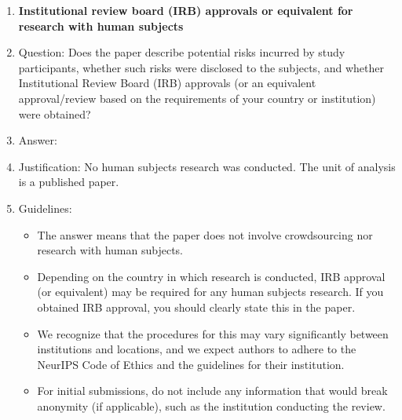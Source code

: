 \documentclass{article}
\begin{document}
\begin{enumerate}
\item {\bf Institutional review board (IRB) approvals or equivalent for research with human subjects}
    \item[] Question: Does the paper describe potential risks incurred by study participants, whether such risks were disclosed to the subjects, and whether Institutional Review Board (IRB) approvals (or an equivalent approval/review based on the requirements of your country or institution) were obtained?
    \item[] Answer: \answerNA{}
    \item[] Justification: No human subjects research was conducted. The unit of analysis is a published paper.
    \item[] Guidelines:
    \begin{itemize}
        \item The answer \answerNA{} means that the paper does not involve crowdsourcing nor research with human subjects.
        \item Depending on the country in which research is conducted, IRB approval (or equivalent) may be required for any human subjects research. If you obtained IRB approval, you should clearly state this in the paper. 
        \item We recognize that the procedures for this may vary significantly between institutions and locations, and we expect authors to adhere to the NeurIPS Code of Ethics and the guidelines for their institution. 
        \item For initial submissions, do not include any information that would break anonymity (if applicable), such as the institution conducting the review.
    \end{itemize}


\end{enumerate}
\end{document}

